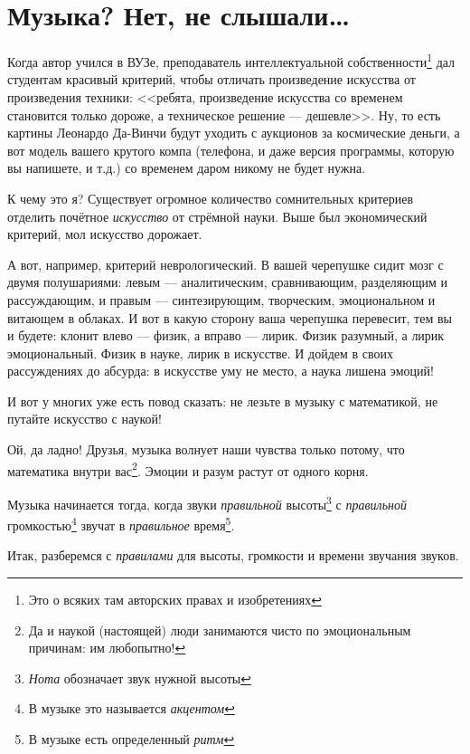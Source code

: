\chapter{Музыка? Нет, не слышали\ldots}
\label{ch:music}

Когда автор учился в ВУЗе, преподаватель интеллектуальной собственности\footnote{Это о всяких там авторских правах и изобретениях} дал студентам красивый критерий, чтобы отличать произведение искусства от произведения техники: <<ребята, произведение искусства со временем становится только дороже, а техническое решение --- дешевле>>. Ну, то есть картины Леонардо Да-Винчи будут уходить с аукционов за космические деньги, а вот модель вашего крутого компа (телефона, и даже версия программы, которую вы напишете, и т.д.) со временем даром никому не будет нужна. 

К чему это я? Существует огромное количество сомнительных критериев отделить почётное \emph{искусство} от стрёмной науки. Выше был экономический критерий, мол искусство дорожает. 

А вот, например, критерий неврологический. В вашей черепушке сидит мозг с двумя полушариями: левым --- аналитическим, сравнивающим, разделяющим и рассуждающим, и правым --- синтезирующим, творческим, эмоциональном и витающем в облаках. И вот в какую сторону ваша черепушка перевесит, тем вы и будете: клонит влево --- физик, а вправо --- лирик. Физик разумный, а лирик эмоциональный. Физик в науке, лирик в искусстве. И дойдем в своих рассуждениях до абсурда: в искусстве уму не место, а наука лишена эмоций!

И вот у многих уже есть повод сказать: не лезьте в музыку с математикой, не путайте искусство с наукой! 

Ой, да ладно! Друзья, музыка волнует наши чувства только потому, что математика внутри вас\footnote{Да и наукой (настоящей) люди занимаются чисто по эмоциональным причинам: им любопытно!}. Эмоции и разум растут от одного корня.

\begin{Definition}[Музыка]
    Музыка начинается тогда, когда звуки \emph{правильной} высоты\footnote{\emph{Нота} обозначает звук нужной высоты} с \emph{правильной} громкостью\footnote{В музыке это называется \emph{акцентом}} звучат в \emph{правильное} время\footnote{В музыке есть определенный \emph{ритм}}.
\end{Definition}

Итак, разберемся с \emph{правилами} для высоты, громкости и времени звучания звуков.


